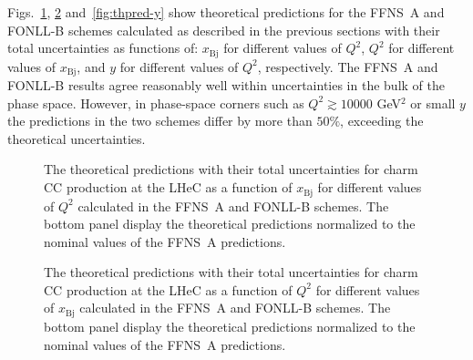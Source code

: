 \documentclass[pdftex,twocolumn,epjc3]{svjour3}          %
\newcommand{\xbj}{\ensuremath{x_{\text{Bj}}}\xspace}
\newcommand{\fonll} {{FONLL-B}\xspace}
\newcommand{\ffns} {{FFNS~A}\xspace}
\begin{document}
Figs.~\ref{fig:thpred-x}, \ref{fig:thpred-q2} and~\ref{fig:thpred-y}
show theoretical predictions for the \ffns and \fonll schemes 
calculated as described in the previous sections 
with their total uncertainties as functions of: \xbj for different values
of $Q^2$, $Q^2$ for different values of \xbj, and $y$ for different
values of $Q^2$, respectively.
%
The \ffns and \fonll results agree reasonably well within
uncertainties in the bulk of the phase space. However, in phase-space
corners such as $Q^2 \gtrsim 10000$ GeV$^2$ or small $y$
the predictions in the two schemes differ by more than $50\%$, exceeding
the theoretical uncertainties.

\begin{figure}
    \centering
    \caption{The theoretical predictions with their total
      uncertainties for charm CC production at the LHeC as a function
      of \xbj for different values of $Q^2$ calculated in the \ffns
      and \fonll schemes. The bottom panel display the theoretical
      predictions normalized to the nominal values of the \ffns
      predictions.}
    \label{fig:thpred-x}
\end{figure}

\begin{figure}
    \centering
    \caption{The theoretical predictions with their total
      uncertainties for charm CC production at the LHeC as a function
      of $Q^2$ for different values of \xbj calculated in the \ffns
      and \fonll schemes. The bottom panel display the theoretical
      predictions normalized to the nominal values of the \ffns
      predictions.}
    \label{fig:thpred-q2}
\end{figure}
\end{document}
